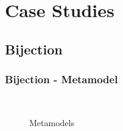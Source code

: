 \documentclass{beamer}
\begin{document}




\section{Case Studies}

\subsection{Bijection}

\begin{frame}
\frametitle{\textbf{Bijection} - \textbf{Metamodel}}

\begin{figure}[ht]
    \centering
    \mbox{\qquad\qquad
          }
    \caption{Metamodels}
    \label{fig:Meta}
\end{figure}

\end{frame}
\end{document}
